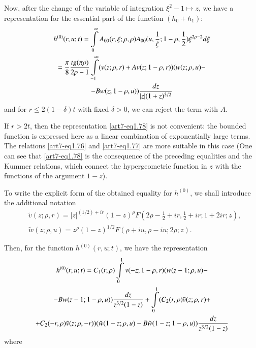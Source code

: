 Now, after the change of the variable of integration $\xi^2 -1 \mapsto z$, we have a representation for the essential part of the function $(h_0 + h_1)$:
\begin{gather}
h^{(0)} (r, u; t) = \int\limits^\infty_0 A_{00} (r, \xi; \rho, \rho) A_{00} (u, \frac{1}{\xi}; 1 - \rho, \frac{1}{2}) \xi^{2 \rho -2} d \xi  \label{art7-eq7.7}\\
= \frac{\pi}{8} \frac{tg (\pi \rho)}{2 \rho-1} \int\limits^\infty_{-1} (v (z; \rho, r) + Av (z ; 1 - \rho, r)) (w (z; \rho, u)-\notag\\
- B w (z; 1 - \rho, u)) \frac{dz}{|z| (1+z)^{3/2}} \notag
\end{gather}\pageoriginale
and for $r \leqslant 2 (1-\delta)t$  with fixed $\delta>0$, we can reject the term with $A$. 

If $r > 2 t$, then the representation \eqref{art7-eq1.78} is not convenient: the bounded function is expressed here as a linear combination of exponentially large terms. The relations \eqref{art7-eq1.76} and \eqref{art7-eq1.77} are more suitable in this case (One can see that \eqref{art7-eq1.78} is the consequence of the preceding equalities and the Kummer relations, which connect the hypergeometric function in $z$ with the functions of the argument $1-z$).  

To write the explicit form of the obtained equality for $h^{(0)}$, we shall introduce the additional notation
\begin{align}
& \tilde{v} (z; \rho, r) = |z|^{(1/2)+ir} (1-z)^{\rho} F (2 \rho -\frac{1}{2} + ir, \frac{1}{2} + ir; 1 + 2 ir; z), 
\label{art7-eq7.8}\\
&  \tilde{w} (z; \rho, u) = z^{\rho} (1-z)^{1/2} F(\rho + iu, \rho- iu; 2 \rho; z).\label{art-eq7.9}
\end{align}

Then, for the function $h^{(0)}(r, u;t)$, we have the representation 
\begin{gather}
h^{(0)} (r, u; t) = C_1 (r, \rho) \int\limits^1_0 v (-z ; 1 -\rho,r) (w (z-1; \rho, u)- \label{art7-eq7.10}\\
- B w (z-1; 1-\rho, u)) \frac{dz}{z^{3/2} (1-z)} + \int\limits^1_0 (C_2 (r,\rho) \tilde{v} (z; \rho, r)+\notag\\
+ C_2 (-r, \rho) \tilde{v} (z; \rho, -r)) (\tilde{w}(1-z; \rho, u) - B \tilde{w} (1-z; 1-\rho, u)) \frac{dz}{z^{3/2} (1-z)} \notag
\end{gather}
where 


